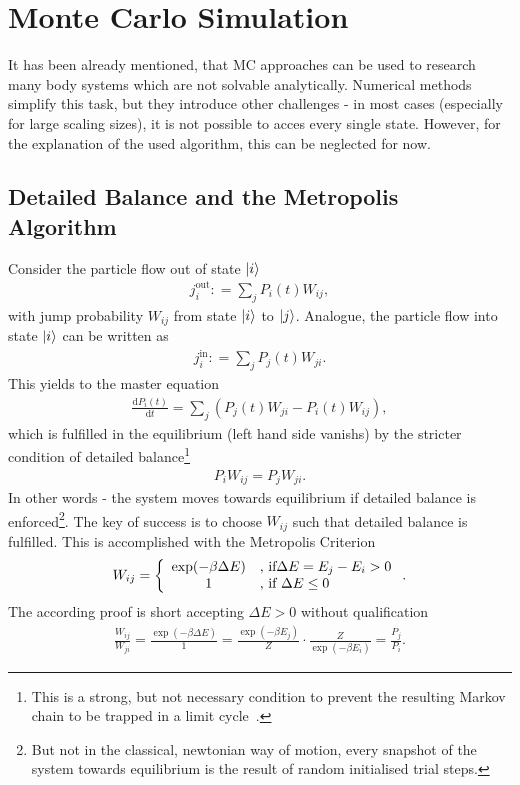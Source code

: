 \section{Monte Carlo Simulation}
It has been already mentioned, that MC approaches can be used to research many body systems which are not solvable analytically.
Numerical methods simplify this task, but they introduce other challenges - in most cases (especially for large scaling sizes), it is not possible to acces every single state.
However, for the explanation of the used algorithm, this can be neglected for now.
\subsection{Detailed Balance and the Metropolis Algorithm}
Consider the particle flow out of state $\ket{i}$
\begin{align}
	j^\text{out}_{i} \mathrel{\mathop:}= \sum_j P_i(t) W_{ij},
\end{align}
with jump probability $W_{ij}$ from state $\ket{i}$ to $\ket{j}$.
Analogue, the particle flow into state $\ket{i}$ can be written as
\begin{align}
	j^\text{in}_{i} \mathrel{\mathop:}= \sum_j P_j(t) W_{ji}.
\end{align}
This yields to the master equation
\begin{align}
	\frac{\mathrm{d}P_i(t)}{\mathrm{d}t} = 
		\sum_{j}\left(P_j(t)W_{ji} - P_i(t)W_{ij}\right),
\end{align}
which is fulfilled in the equilibrium (left hand side vanishs) by the stricter condition of detailed balance\footnote{This is a strong, but not necessary condition to prevent the resulting Markov chain to be trapped in a limit cycle~\cite{newman1999monte}.}
\begin{align}
	P_iW_{ij} = P_jW_{ji}.
\end{align}
In other words - the system moves towards equilibrium if detailed balance is enforced\footnote{But not in the classical, newtonian way of motion, every snapshot of the system towards equilibrium is the result of random initialised trial steps.}.
The key of success is to choose $W_{ij}$ such that detailed balance is fulfilled.
This is accomplished with the Metropolis Criterion
\begin{align}
	W_{ij} = \left\{
		\begin{array}{c l}
			\exp(-\beta\Delta E)&\text{, if}\Delta E = E_j - E_i > 0\\
			1										&\text{, if }\Delta E \leq 0 
		\end{array}\right..
\end{align}
The according proof is short accepting $\Delta E > 0$ without qualification
\begin{align} 
	\frac{W_{ij}}{W_{ji}} = \frac{\exp\left(-\beta\Delta E\right)}{1} = \frac{\exp(-\beta E_j)}{Z}\cdot\frac{Z}{\exp(-\beta E_i)} = \frac{P_j}{P_i}.
\end{align}

